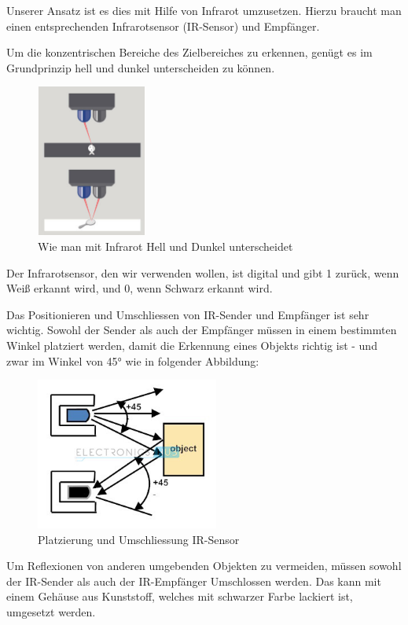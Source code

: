 \documentclass[a4paper]{report}
\begin{document}
Unserer Ansatz ist es dies mit Hilfe von Infrarot umzusetzen. Hierzu braucht man einen entsprechenden Infrarotsensor (IR-Sensor) und Empfänger.

Um die konzentrischen Bereiche des Zielbereiches zu erkennen, genügt es im Grundprinzip hell und dunkel unterscheiden zu können.

\begin{figure}[h!]
	\centering
	\includegraphics[keepaspectratio,height=5cm]{InfrarotHellDunkel}
	\caption{Wie man mit Infrarot Hell und Dunkel unterscheidet \parencite{Caro2015}}
	\label{fig:InfrarotHellDunkel}
\end{figure}

Der Infrarotsensor, den wir verwenden wollen, ist digital und gibt 1 zurück, wenn Weiß erkannt wird, und 0, wenn Schwarz erkannt wird.

Das Positionieren und Umschliessen von IR-Sender und Empfänger ist sehr wichtig. Sowohl der Sender als auch der Empfänger müssen in einem bestimmten Winkel platziert werden, damit die Erkennung eines Objekts richtig ist - und zwar im Winkel von 45\si{\degree} wie in folgender Abbildung:


\begin{figure}[h!]
	\centering
	\includegraphics[keepaspectratio,height=5cm]{IRdirectivity.jpg}
	\caption{Platzierung und Umschliessung IR-Sensor \parencite{ElectronicsHub}}
	\label{fig:InfrarotPlatzierung}
\end{figure}


Um Reflexionen von anderen umgebenden Objekten zu vermeiden, müssen sowohl der IR-Sender als auch der IR-Empfänger Umschlossen werden. Das kann mit einem Gehäuse aus Kunststoff, welches mit schwarzer Farbe lackiert ist, umgesetzt werden.
\end{document}
